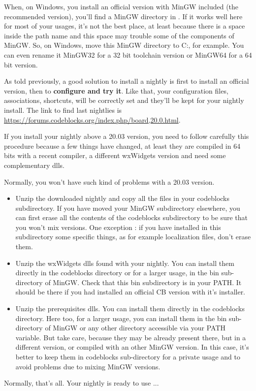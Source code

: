 When, on Windows, you install an official version with MinGW included (the recommended version), you'll find a MinGW directory in . If it works well here for most of your usages, it's not the best place, at least because there is a space inside the path name and this space may trouble some of the components of MinGW. So, on Windows, move this MinGW directory to C:, for example. You can even rename it MinGW32 for a 32 bit toolchain version or MinGW64 for a 64 bit version.

As told previously, a good solution to install a nightly is first to install an official version, then to \textbf{configure and try it}. Like that, your configuration files, associations, shortcuts, will be correctly set and they'll be kept for your nightly install. The link to find last nightlies is \url{https://forums.codeblocks.org/index.php/board,20.0.html}.

If you install your nightly above a 20.03 version, you need to follow carefully this procedure because a few things have changed, at least they are compiled in 64 bits with a recent compiler, a different wxWidgets version and need some complementary dlls.

Normally, you won't have such kind of problems with a 20.03 version.
\begin{itemize}
\item Unzip the downloaded nightly and copy all the files in your codeblocks subdirectory. If you have moved your MinGW subdirectory elsewhere, you can first erase all the contents of the codeblocks subdirectory to be sure that you won't mix versions. One exception : if you have installed in this subdirectory some specific things, as for example localization files, don't erase them.
\item Unzip the wxWidgets dlls found with your nightly. You can install them directly in the codeblocks directory or for a larger usage, in the bin sub-directory of MinGW. Check that this bin subdirectory is in your PATH. It should be there if you had installed an official CB version with it's installer.
\item Unzip the prerequisites dlls. You can install them directly in the codeblocks directory. Here too, for a larger usage, you can install them in the bin sub-directory of MinGW or any other directory accessible via your PATH variable. But take care, because they may be already present there, but in a different version, or compiled with an other MinGW version. In this case, it's better to keep them in codeblocks sub-directory for a private usage and to avoid problems due to mixing MinGW versions.
\end{itemize}


Normally, that's all. Your nightly is ready to use ...
